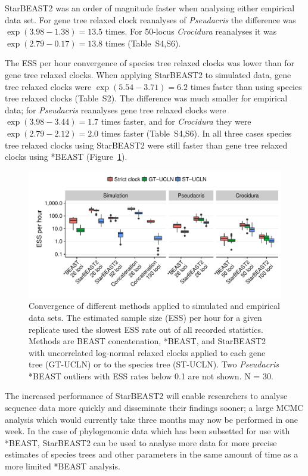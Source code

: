 \documentclass[12pt]{article}
\begin{document}
StarBEAST2 was an order of magnitude faster when analysing either
empirical data set. For gene tree relaxed clock reanalyses of
\textit{Pseudacris} the difference was $\exp(3.98 - 1.38) = 13.5$ times. For
50-locus \textit{Crocidura} reanalyses it was $\exp(2.79 - 0.17) = 13.8$ times
(Table~S4,S6).

The ESS per hour convergence of species tree relaxed clocks was lower than for
gene tree relaxed clocks. When applying StarBEAST2 to simulated data, gene tree relaxed clocks were
$\exp(5.54 - 3.71) = 6.2$ times faster than using species tree relaxed clocks (Table~S2). The difference was much smaller for empirical data;
for \textit{Pseudacris} reanalyses gene tree relaxed clocks were $\exp(3.98 -
3.44) = 1.7$ times faster, and for \textit{Crocidura} they were $\exp(2.79 -
2.12) = 2.0$ times faster (Table~S4,S6). In all three cases species tree relaxed clocks
using StarBEAST2 were still faster than gene tree relaxed clocks using *BEAST
(Figure~\ref{fig:essPerHourComparison}).

\begin{figure}[htb!]
\centering
\includegraphics[width=130mm]{minimum-ess_per_hour-comparison.pdf}
\caption
{Convergence of different methods applied to simulated and empirical data
sets. The estimated sample size (ESS) per hour for a given replicate used the
slowest ESS rate out of all recorded statistics. Methods are BEAST
concatenation, *BEAST, and StarBEAST2 with uncorrelated log-normal relaxed
clocks applied to each gene tree (GT-UCLN) or to the species tree (ST-UCLN).
Two \textit{Pseudacris} *BEAST outliers with ESS rates below 0.1
are not shown.  N = 30.}
\label{fig:essPerHourComparison}
\end{figure}

The increased performance of StarBEAST2 will enable researchers to analyse
sequence data more quickly and disseminate their findings sooner; a large MCMC
analysis which would currently take three months may now be performed in one
week. In the case of phylogenomic data which has been subsetted for use with
*BEAST, StarBEAST2 can be used to analyse more data for more
precise estimates of species trees and other parameters in the same amount of
time as a more limited *BEAST analysis.
\end{document}
